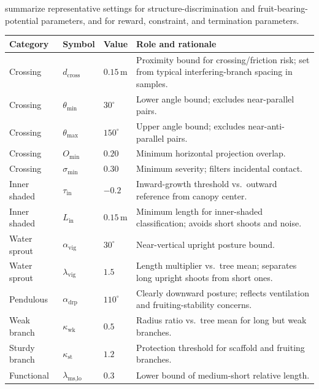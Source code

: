\documentclass[12pt,a4paper,fontset=fandol]{ctexart}
\begin{document}
 summarize representative settings for structure-discrimination and fruit-bearing-potential parameters, and for reward, constraint, and termination parameters.

\begin{table}[H]
\centering
\small
\setlength{\tabcolsep}{5pt}
\renewcommand{\arraystretch}{1.15}
\begin{tabularx}{\textwidth}{>{\raggedright\arraybackslash}p{2.1cm}>{\raggedright\arraybackslash}p{2.4cm}>{\raggedright\arraybackslash}p{1.9cm}>{\raggedright\arraybackslash}X}
\toprule
\textbf{Category} & \textbf{Symbol} & \textbf{Value} & \textbf{Role and rationale} \\
\midrule
Crossing & $d_{\text{cross}}$ & $0.15$\,m & Proximity bound for crossing/friction risk; set from typical interfering-branch spacing in samples. \\
Crossing & $\theta_{\min}$ & $30^\circ$ & Lower angle bound; excludes near-parallel pairs. \\
Crossing & $\theta_{\max}$ & $150^\circ$ & Upper angle bound; excludes near-anti-parallel pairs. \\
Crossing & $O_{\min}$ & $0.20$ & Minimum horizontal projection overlap. \\
Crossing & $\sigma_{\min}$ & $0.30$ & Minimum severity; filters incidental contact. \\
Inner shaded & $\tau_{\text{in}}$ & $-0.2$ & Inward-growth threshold vs.\ outward reference from canopy center. \\
Inner shaded & $L_{\text{in}}$ & $0.15$\,m & Minimum length for inner-shaded classification; avoids short shoots and noise. \\
Water sprout & $\alpha_{\text{vig}}$ & $30^\circ$ & Near-vertical upright posture bound. \\
Water sprout & $\lambda_{\text{vig}}$ & $1.5$ & Length multiplier vs.\ tree mean; separates long upright shoots from short ones. \\
Pendulous & $\alpha_{\text{drp}}$ & $110^\circ$ & Clearly downward posture; reflects ventilation and fruiting-stability concerns. \\
Weak branch & $\kappa_{\text{wk}}$ & $0.5$ & Radius ratio vs.\ tree mean for long but weak branches. \\
Sturdy branch & $\kappa_{\text{st}}$ & $1.2$ & Protection threshold for scaffold and fruiting branches. \\
Functional & $\lambda_{\text{ms,lo}}$ & $0.3$ & Lower bound of medium-short relative length. \\

\end{tabularx}
\end{table}
\end{document}
